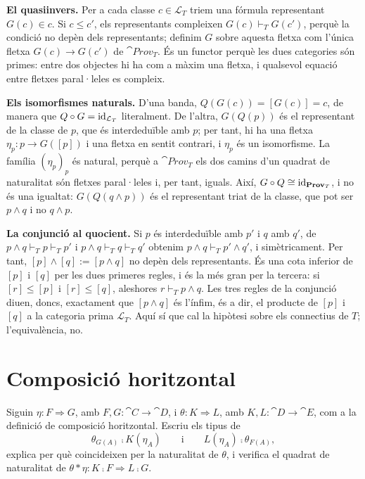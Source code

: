 \begin{solucio}
\textbf{El quasiinvers.} Per a cada classe $c\in\mathcal L_T$ triem una fórmula representant $G(c)\in c$. Si $c\leq c'$, els representants compleixen $G(c)\vdash_T G(c')$, perquè la condició no depèn dels representants; definim $G$ sobre aquesta fletxa com l'única fletxa $G(c)\to G(c')$ de $\cat{Prov}_T$. És un functor perquè les dues categories són primes: entre dos objectes hi ha com a màxim una fletxa, i qualsevol equació entre fletxes paral·leles es compleix.

\textbf{Els isomorfismes naturals.} D'una banda, $Q(G(c))=[G(c)]=c$, de manera que $Q\circ G=\operatorname{id}_{\mathcal L_T}$ literalment. De l'altra, $G(Q(p))$ és el representant de la classe de $p$, que és interdeduïble amb $p$; per tant, hi ha una fletxa $\eta_p\colon p\to G([p])$ i una fletxa en sentit contrari, i $\eta_p$ és un isomorfisme. La família $(\eta_p)_p$ és natural, perquè a $\cat{Prov}_T$ els dos camins d'un quadrat de naturalitat són fletxes paral·leles i, per tant, iguals. Així, $G\circ Q\cong\operatorname{id}_{\mathbf{Prov}_T}$, i no és una igualtat: $G(Q(q\land p))$ és el representant triat de la classe, que pot ser $p\land q$ i no $q\land p$.

\textbf{La conjunció al quocient.} Si $p$ és interdeduïble amb $p'$ i $q$ amb $q'$, de $p\land q\vdash_T p\vdash_T p'$ i $p\land q\vdash_T q\vdash_T q'$ obtenim $p\land q\vdash_T p'\land q'$, i simètricament. Per tant, $[p]\wedge[q]:=[p\land q]$ no depèn dels representants. És una cota inferior de $[p]$ i $[q]$ per les dues primeres regles, i és la més gran per la tercera: si $[r]\leq[p]$ i $[r]\leq[q]$, aleshores $r\vdash_T p\land q$. Les tres regles de la conjunció diuen, doncs, exactament que $[p\land q]$ és l'ínfim, és a dir, el producte de $[p]$ i $[q]$ a la categoria prima $\mathcal L_T$. Aquí sí que cal la hipòtesi sobre els connectius de $T$; l'equivalència, no.
\end{solucio}

\section{Composició horitzontal}

\begin{exercici}\label{pr-comp-horitzontal}
Siguin $\eta\colon F\Rightarrow G$, amb $F,G\colon\cat{C}\to\cat{D}$, i $\theta\colon K\Rightarrow L$, amb $K,L\colon\cat{D}\to\cat{E}$, com a la definició de composició horitzontal. Escriu els tipus de
\[
\theta_{G(A)}\comp K(\eta_A)
\qquad\text{i}\qquad
L(\eta_A)\comp\theta_{F(A)},
\]
explica per què coincideixen per la naturalitat de $\theta$, i verifica el quadrat de naturalitat de $\theta\ast\eta\colon K\comp F\Rightarrow L\comp G$.
\end{exercici}

